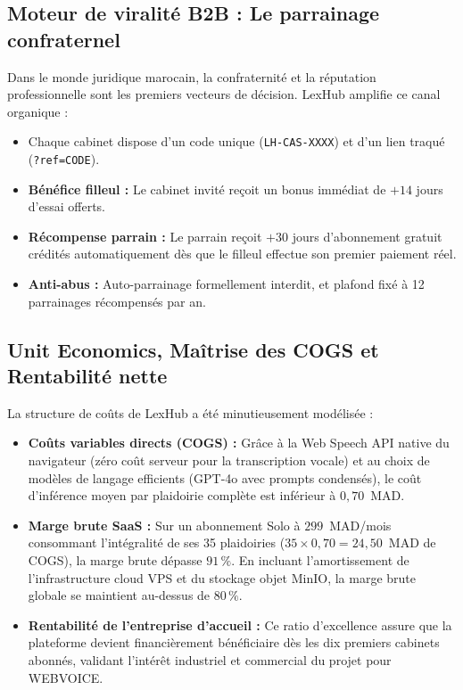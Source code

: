 \subsection{Moteur de viralité B2B : Le parrainage confraternel}
Dans le monde juridique marocain, la confraternité et la réputation professionnelle sont les premiers vecteurs de décision. LexHub amplifie ce canal organique :
\begin{itemize}[leftmargin=*]
  \item Chaque cabinet dispose d'un code unique (\texttt{LH-CAS-XXXX}) et d'un lien traqué (\texttt{?ref=CODE}).
  \item \textbf{Bénéfice filleul :} Le cabinet invité reçoit un bonus immédiat de $+14$ jours d'essai offerts.
  \item \textbf{Récompense parrain :} Le parrain reçoit $+30$ jours d'abonnement gratuit crédités automatiquement dès que le filleul effectue son premier paiement réel.
  \item \textbf{Anti-abus :} Auto-parrainage formellement interdit, et plafond fixé à 12 parrainages récompensés par an.
\end{itemize}

\subsection{Unit Economics, Maîtrise des COGS et Rentabilité nette}
La structure de coûts de LexHub a été minutieusement modélisée :
\begin{itemize}[leftmargin=*]
  \item \textbf{Coûts variables directs (COGS) :} Grâce à la Web Speech API native du navigateur (zéro coût serveur pour la transcription vocale) et au choix de modèles de langage efficients (GPT-4o avec prompts condensés), le coût d'inférence moyen par plaidoirie complète est inférieur à $0{,}70$~MAD.
  \item \textbf{Marge brute SaaS :} Sur un abonnement Solo à $299$~MAD/mois consommant l'intégralité de ses 35 plaidoiries ($35 \times 0{,}70 = 24{,}50$~MAD de COGS), la marge brute dépasse \textbf{$91\,\%$}. En incluant l'amortissement de l'infrastructure cloud VPS et du stockage objet MinIO, la marge brute globale se maintient au-dessus de \textbf{$80\,\%$}.
  \item \textbf{Rentabilité de l'entreprise d'accueil :} Ce ratio d'excellence assure que la plateforme devient financièrement bénéficiaire dès les dix premiers cabinets abonnés, validant l'intérêt industriel et commercial du projet pour WEBVOICE.
\end{itemize}


